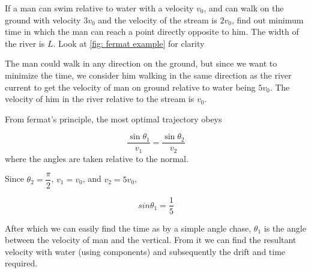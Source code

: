 \begin{example}
    If a man can swim relative to water with a velocity \(v_0\), and can walk on the ground 
    with velocity \(3v_0\) and the velocity of the stream is \(2v_0\), find out minimum time 
    in which the man can reach a point directly opposite to him. The width of the river is \(L\).
    Look at \cref{fig: fermat example} for clarity

    \begin{soln}
        The man could walk in any direction on the ground, but since we want to minimize 
        the time, we consider him walking in the same direction as the river current to get 
        the velocity of man on ground relative to water being \(5v_0\). The velocity 
        of him in the river relative to the stream is \(v_0\). 

        From fermat's principle, the most optimal trajectory obeys 
        
        \begin{equation*}
            \frac{\sin\theta_1}{v_1} = \frac{\sin\theta_2}{v_2}
        \end{equation*}
        where the angles are taken relative to the normal. 
        
        Since \(\theta_2 = \dfrac{\pi}{2}\), \(v_1 = v_0\), and \(v_2 = 5v_0\),

        \begin{equation*}
            sin\theta_1 = \frac{1}{5}
        \end{equation*}

        After which we can easily find the time as by a simple angle chase, \(\theta_1\) is 
        the angle between the velocity of man and the vertical. From it we 
        can find the resultant velocity with water (using components) 
        and subsequently the drift and time required.
    \end{soln}
\end{example}
